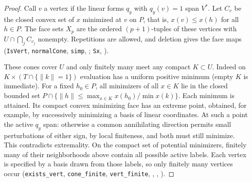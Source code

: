 \begin{proof}
Call $v$ a vertex if the linear forms $q_y$ with $q_y(v)=1$ span $V^*$.
Let $C_v$ be the closed convex set of $x$ minimized at $v$ on $P$,
that is, $x(v)\le x(h)$ for all $h\in P$. The face sets $X_p$ are the
ordered $(p+1)$-tuples of these vertices with $U\cap\bigcap_j C_{v_j}$
nonempty. Repetitions are allowed, and deletion gives the face maps
(\nolinkurl{IsVert}, \nolinkurl{normalCone}, \nolinkurl{simp},
;
\nolinkurl{Sx}, ).

These cones cover $U$ and only finitely many meet any compact
$K\subset U$. Indeed on $K\times(T\cap\{\|k\|=1\})$ evaluation
has a uniform positive minimum (empty $K$ is immediate). For a fixed
$h_0\in P$, all minimizers of all $x\in K$ lie in the closed bounded
set $P\cap\{\|h\|\le \max_{x\in K}x(h_0)/\min x(k)\}$.
Each minimum is attained. Its compact convex minimizing face has an
extreme point, obtained, for example, by successively minimizing a
basis of linear coordinates. At such a point the active $q_y$ span:
otherwise a common annihilating direction permits small perturbations
of either sign, by local finiteness, and both must still minimize.
This contradicts extremality. On the compact set of potential
minimizers, finitely many of their neighborhoods above contain
all possible active labels. Each vertex is specified by a basis drawn
from those labels, so only finitely many vertices occur
(\nolinkurl{exists_vert}, \nolinkurl{cone_finite}, \nolinkurl{vert_finite},
,
,
).


\end{proof}
